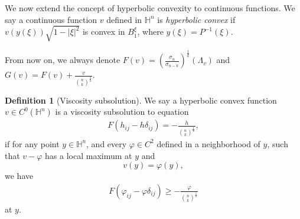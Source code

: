 \documentclass[reqno]{amsart}
\theoremstyle{remark}
\newtheorem{remark}[theorem]{Remark}
\theoremstyle{definition}
\newtheorem{definition}[theorem]{Definition}
\numberwithin{equation}{section}
\begin{document}
We now extend the concept of hyperbolic convexity to continuous functions. We say a continuous function $v$ defined in $\mathbb{H}^n$ is \emph{hyperbolic convex} if $v\left( y(\xi) \right) \sqrt{1-|\xi|^2}$ is convex in $B_1^{\xi}$, where $y(\xi) = P^{-1}(\xi)$.

From now on, we always denote $F(v)=\left( \frac{\sigma_n}{\sigma_{n-k}} \right)^{\frac{1}{k}}(\Lambda_v)$ and $G(v) =F(v) + \frac{v}{\binom{n}{k}^{\frac{1}{k}}}$.

\begin{definition}[Viscosity subsolution]
    We say a hyperbolic convex function $v \in C^0(\mathbb{H}^n)$ is a viscosity subsolution to equation
    \begin{align}
        F(h_{ij}-h\delta_{ij}) = -\frac{h}{\binom{n}{k}^{\frac{1}{k}}}, \label{viscosity subsolution equation}
    \end{align}
    if for any point $y \in \mathbb{H}^n$, and every $\varphi \in C^2$ defined in a neighborhood of $y$, such that $v-\varphi$ has a local maximum at $y$ and
    \[
    v(y) = \varphi(y),
    \]
    we have
    \begin{align*}
        F(\varphi_{ij}-\varphi\delta_{ij}) \geqslant -\frac{\varphi}{\binom{n}{k}^{\frac{1}{k}}}
    \end{align*}
    at $y$.
\end{definition}

\end{document}
